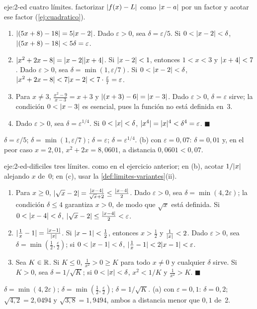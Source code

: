 \begin{solucion}{eje:2-ed}
\datos cuatro límites.
\planteamiento factorizar $\lvert f(x)-L\rvert$ como $\lvert x-a\rvert$ por un factor y acotar ese factor (\cref{ej:cuadratico}).
\pasos
\begin{enumerate}[label=(\alph*)]
  \item $\lvert(5x+8)-18\rvert=5\lvert x-2\rvert$. Dado $\varepsilon>0$, sea $\delta=\varepsilon/5$. Si $0<\lvert x-2\rvert<\delta$, $\lvert(5x+8)-18\rvert<5\delta=\varepsilon$.
  \item $\lvert x^{2}+2x-8\rvert=\lvert x-2\rvert\lvert x+4\rvert$. Si $\lvert x-2\rvert<1$, entonces $1<x<3$ y $\lvert x+4\rvert<7$. Dado $\varepsilon>0$, sea $\delta=\min(1,\varepsilon/7)$. Si $0<\lvert x-2\rvert<\delta$, $\lvert x^{2}+2x-8\rvert<7\lvert x-2\rvert<7\cdot\frac{\varepsilon}{7}=\varepsilon$.
  \item Para $x\ne3$, $\frac{x^{2}-9}{x-3}=x+3$ y $\lvert(x+3)-6\rvert=\lvert x-3\rvert$. Dado $\varepsilon>0$, $\delta=\varepsilon$ sirve; la condición $0<\lvert x-3\rvert$ es esencial, pues la función no está definida en~3.
  \item Dado $\varepsilon>0$, sea $\delta=\varepsilon^{1/4}$. Si $0<\lvert x\rvert<\delta$, $\lvert x^{4}\rvert=\lvert x\rvert^{4}<\delta^{4}=\varepsilon$. \hfill$\blacksquare$
\end{enumerate}
\resultado $\delta=\varepsilon/5$; $\delta=\min(1,\varepsilon/7)$; $\delta=\varepsilon$; $\delta=\varepsilon^{1/4}$.
\comprobacion (b) con $\varepsilon=0{,}07$: $\delta=0{,}01$ y, en el peor caso $x=2{,}01$, $x^{2}+2x=8{,}0601$, a distancia $0{,}0601<0{,}07$.
\end{solucion}

\begin{solucion}{eje:2-ed-dificiles}
\datos tres límites.
\planteamiento como en el ejercicio anterior; en (b), acotar $1/\lvert x\rvert$ alejando $x$ de~0; en (c), usar la \cref{def:limites-variantes}(ii).
\pasos
\begin{enumerate}[label=(\alph*)]
  \item Para $x\ge0$, $\lvert\sqrt x-2\rvert=\frac{\lvert x-4\rvert}{\sqrt x+2}\le\frac{\lvert x-4\rvert}{2}$. Dado $\varepsilon>0$, sea $\delta=\min(4,2\varepsilon)$; la condición $\delta\le4$ garantiza $x>0$, de modo que $\sqrt x$ está definida. Si $0<\lvert x-4\rvert<\delta$, $\lvert\sqrt x-2\rvert\le\frac{\lvert x-4\rvert}{2}<\varepsilon$.
  \item $\lvert\frac1x-1\rvert=\frac{\lvert x-1\rvert}{\lvert x\rvert}$. Si $\lvert x-1\rvert<\frac12$, entonces $x>\frac12$ y $\frac{1}{\lvert x\rvert}<2$. Dado $\varepsilon>0$, sea $\delta=\min(\frac12,\frac\varepsilon2)$; si $0<\lvert x-1\rvert<\delta$, $\lvert\frac1x-1\rvert<2\lvert x-1\rvert<\varepsilon$.
  \item Sea $K\in\mathbb{R}$. Si $K\le0$, $\frac{1}{x^{2}}>0\ge K$ para todo $x\ne0$ y cualquier $\delta$ sirve. Si $K>0$, sea $\delta=1/\sqrt K$; si $0<\lvert x\rvert<\delta$, $x^{2}<1/K$ y $\frac{1}{x^{2}}>K$. \hfill$\blacksquare$
\end{enumerate}
\resultado $\delta=\min(4,2\varepsilon)$; $\delta=\min(\frac12,\frac\varepsilon2)$; $\delta=1/\sqrt K$.
\comprobacion (a) con $\varepsilon=0{,}1$: $\delta=0{,}2$; $\sqrt{4{,}2}=2{,}0494$ y $\sqrt{3{,}8}=1{,}9494$, ambos a distancia menor que $0{,}1$ de~2.
\end{solucion}

